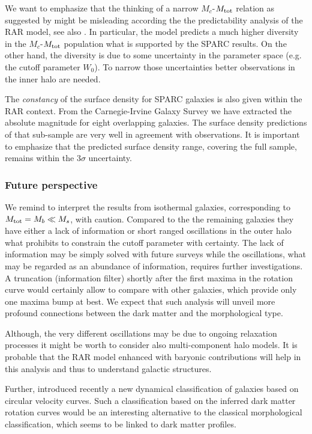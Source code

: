 We want to emphasize that the thinking of a narrow $M_c$-$M_{\rm tot}$ relation as suggested by \citet{2002ApJ...578...90F} might be misleading according the the predictability analysis of the RAR model, see also \citet{RAR-II}. In particular, the model predicts a much higher diversity in the $M_c$-$M_{\rm tot}$ population what is supported by the SPARC results. On the other hand, the diversity is due to some uncertainty in the parameter space (e.g. the cutoff parameter $W_0$). To narrow those uncertainties better observations in the inner halo are needed.

The \textit{constancy} of the surface density \citep{2009MNRAS.397.1169D} for SPARC galaxies is also given within the RAR context. From the Carnegie-Irvine Galaxy Survey we have extracted the absolute magnitude for eight overlapping galaxies. The surface density predictions of that sub-sample are very well in agreement with observations. It is important to emphasize that the predicted surface density range, covering the full sample, remains within the $3\sigma$ uncertainty.

\subsubsection*{Future perspective}
We remind to interpret the results from isothermal galaxies, corresponding to $M_{\rm tot} = M_b \ll M_s$, with caution. Compared to the the remaining galaxies they have either a lack of information or short ranged oscillations in the outer halo what prohibits to constrain the cutoff parameter with certainty. The lack of information may be simply solved with future surveys while the oscillations, what may be regarded as an abundance of information, requires further investigations. A truncation (information filter) shortly after the first maxima in the rotation curve would certainly allow to compare with other galaxies, which provide only one maxima bump at best. We expect that such analysis will unveil more profound connections between the dark matter and the morphological type. 

Although, the very different oscillations may be due to ongoing relaxation processes it might be worth to consider also multi-component halo models. It is probable that the RAR model enhanced with baryonic contributions will help in this analysis and thus to understand galactic structures.

Further, \citet{2017MNRAS.469.2539K} introduced recently a new dynamical classification of galaxies based on circular velocity curves. Such a classification based on the inferred dark matter rotation curves would be an interesting alternative to the classical morphological classification, which seems to be linked to dark matter profiles.